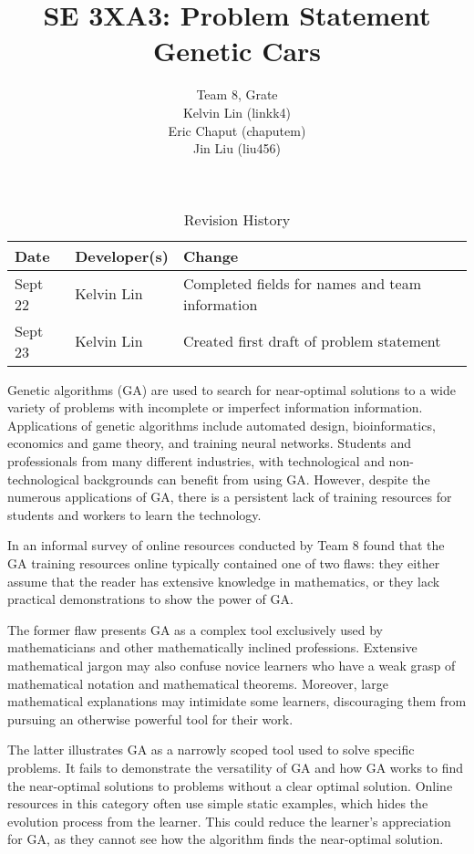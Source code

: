 \documentclass{article}
\title{SE 3XA3: Problem Statement\\Genetic Cars}
\author{Team 8, Grate
		\\ Kelvin Lin (linkk4)
		\\ Eric Chaput (chaputem)
		\\ Jin Liu (liu456)
}
\date{}
\begin{document}
\begin{table}[hp]
\caption{Revision History} \label{TblRevisionHistory}
\begin{tabularx}{\textwidth}{llX}
\toprule
\textbf{Date} & \textbf{Developer(s)} & \textbf{Change}\\
\midrule
Sept 22 & Kelvin Lin & Completed fields for names and team information\\
Sept 23 & Kelvin Lin & Created first draft of problem statement\\
\bottomrule
\end{tabularx}
\end{table}

\newpage

\maketitle

Genetic algorithms (GA) are used to search for near-optimal solutions to a wide variety of problems with incomplete or imperfect information information. Applications of genetic algorithms include automated design, bioinformatics, economics and game theory, and training neural networks. Students and professionals from many different industries, with technological and non-technological backgrounds can benefit from using GA. However, despite the numerous applications of GA, there is a persistent lack of training resources for students and workers to learn the technology. 

In an informal survey of online resources conducted by Team 8 found that the GA training resources online typically contained one of two flaws: they either assume that the reader has extensive knowledge in mathematics, or they lack practical demonstrations to show the power of GA. 

The former flaw presents GA as a complex tool exclusively used by mathematicians and other mathematically inclined professions. Extensive mathematical jargon may also confuse novice learners who have a weak grasp of mathematical notation and mathematical theorems. Moreover, large mathematical explanations may intimidate some learners, discouraging them from pursuing an otherwise powerful tool for their work. 

The latter illustrates GA as a narrowly scoped tool used to solve specific problems. It fails to demonstrate the versatility of GA and how GA works to find the near-optimal solutions to problems without a clear optimal solution. Online resources in this category often use simple static examples, which hides the evolution process from the learner. This could reduce the learner's appreciation for GA, as they cannot see how the algorithm finds the near-optimal solution.
\end{document}
